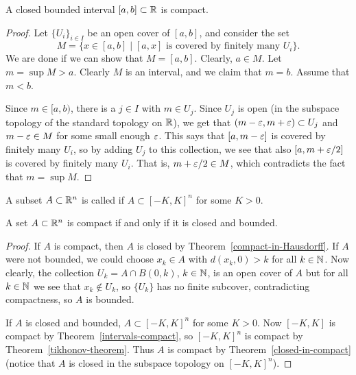 \begin{thm}
  \label{intervals-compact}
  A closed bounded interval $[a,b] \subset \mathbb{R}$ is compact.
\end{thm}
\begin{proof}
  Let $\{U_i\}_{i\in I}$ be an open cover of $[a,b]$, and consider the set
  \[
    M = \{x \in [a,b] \mid \text{$[a,x]$ is covered by finitely many $U_i$}\}.
  \]
  We are done if we can show that $M = [a,b]$. Clearly, $a \in M$. Let $m = \sup M > a$. Clearly $M$ is an interval, and we claim that $m = b$. Assume that $m < b$.
  
  Since $m \in [a,b)$, there is a $j \in I$ with $m \in U_j$. Since $U_j$ is open (in the subspace topology of the standard topology on $\mathbb{R}$), we get that $(m-\varepsilon,m+\varepsilon) \subset U_j$ and $m - \varepsilon \in M$ for some small enough $\varepsilon$. This says that $[a,m-\varepsilon]$ is covered by finitely many $U_i$, so by adding $U_j$ to this collection, we see that also $[a,m+\varepsilon/2]$ is covered by finitely many $U_i$. That is, $m+\varepsilon/2 \in M$, which contradicts the fact that $m = \sup M$.  
\end{proof}
\begin{defn}
  A subset $A \subset \mathbb{R}^n$ is called  if $A \subset [-K,K]^n$ for some $K > 0$.
\end{defn}
\begin{thm}
  \label{heine-borel}
  A set $A \subset \mathbb{R}^n$ is compact if and only if it is closed and bounded.
\end{thm}
\begin{proof}
  If $A$ is compact, then $A$ is closed by Theorem~\ref{compact-in-Hausdorff}. If $A$ were not bounded, we could choose $x_k \in A$ with $d(x_k,0) > k$ for all $k \in \mathbb{N}$. Now clearly, the collection $U_k = A \cap B(0,k)$, $k \in \mathbb{N}$, is an open cover of $A$ but for all $k \in \mathbb{N}$ we see that $x_k \notin U_k$, so $\{U_k\}$ has no finite subcover, contradicting compactness, so $A$ is bounded.
  
  If $A$ is closed and bounded, $A \subset [-K,K]^n$ for some $K > 0$. Now $[-K,K]$ is compact by Theorem~\ref{intervals-compact}, so $[-K,K]^n$ is compact by Theorem~\ref{tikhonov-theorem}. Thus $A$ is compact by Theorem~\ref{closed-in-compact} (notice that $A$ is closed in the subspace topology on $[-K,K]^n$).
\end{proof}
